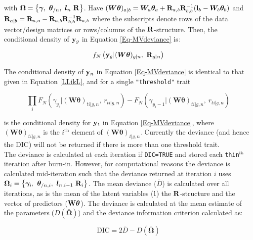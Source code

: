 \documentclass{article}
\begin{document}
with ${\bm \Omega} = \left\{{\bm \gamma},\ {\bm \theta}_{/n},\ {\bm l}_{n}\ {\bf R}\right\}$.  Have $({\bm W}{\bm \theta})_{a|b}={\bm W}_{a}{\bm \theta}_{a}+{\bf R}_{a,b}{\bf R}^{-1}_{b,b}({\bf l}_{b}-{\bm W}_{b}{\bm \theta}_{b})$ and ${\bf R}_{a |b} = {\bf R}_{a,a}-{\bf R}_{a,b}{\bf R}^{-1}_{b,b}{\bf R}_{a,b}$ where the subscripts denote rows of the data vector/design matrices or rows/columns of the ${\bf R}$-structure.
Then, the conditional density of ${\bf y}_{g}$ in Equation \ref{Eq-MVdeviance} is:

\begin{equation}
f_{N}\left({\bf y}_{g} | ({\bm W}{\bm \theta})_{g|n},\ {\bf R}_{g|n}\right) 
\end{equation}

The conditional density of ${\bf y}_{n}$ in Equation \ref{Eq-MVdeviance} is identical to that given in Equation \ref{LLikL},  and for a single \texttt{"threshold"} trait  


\begin{equation}
\prod_{i} F_{N}(\gamma_{y_{i}} | ({\bm W}{\bm \theta})_{ti|g,n}, \ r_{ti|g, n})-F_{N}(\gamma_{y_{i}-1} | ({\bm W}{\bm \theta})_{ti|g,n}, \ r_{ti|g, n})
\label{Eq-cpmvnorm}
\end{equation}

is the conditional density for ${\bf y}_{t}$ in Equation \ref{Eq-MVdeviance}, where $({\bm W}{\bm \theta})_{ti|g,n}$ is the $i^{\textrm{th}}$ element of $({\bm W}{\bm \theta})_{t|g,n}$. Currently the deviance (and hence the DIC) will not be returned if there is more than one threshold trait.\\

The deviance is calculated at each iteration if \texttt{DIC=TRUE} and stored each \texttt{thin}$^{th}$ iteration after burn-in.  However, for computational reasons the deviance is calculated mid-iteration such that the deviance returned at iteration $i$  uses ${\bm \Omega}_{i} = \left\{{\bm \gamma}_{i},\ {\bm \theta}_{/n, i},\ {\bm l}_{n, i-1}\ {\bf R}_{i}\right\}$. The mean deviance ($\bar{D}$) is calculated over all iterations, as is the mean of the latent variables (${\bf l}$) the ${\bf R}$-structure and the vector of predictors (${\bf W}{\bm \theta}$).  The deviance is calculated at the mean estimate of the parameters ($D(\bar{\bm \Omega})$) and the deviance information criterion calculated as:

\begin{equation}
\textrm{DIC} = 2\bar{D}-D(\bar{\bm \Omega})
\end{equation}
\end{document}
